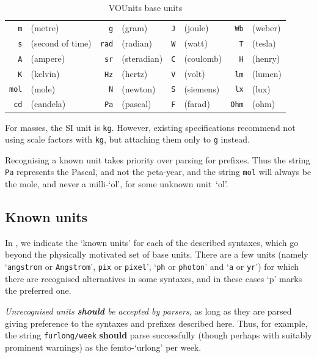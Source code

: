 \documentclass[11pt,notitlepage,onecolumn]{ivoa}
\newcommand*\norm[1]{\textbf{\color{ivoacolor}#1}}
\newcommand{\unit}[1]{\texttt{\small\color{orange}#1}}
\begin{document}
\begin{table}[ht]
\begin{center}
\def\arraystretch{1.2}
\begin{tabular}{|rl|rl|rl|rl|}\hline
\unit{m}&(metre)		&\unit{g}&(gram) 	&\unit{J}&(joule)     	&\unit{Wb}&(weber)\\
\unit{s}&(second of time)	&\unit{rad}&(radian)    &\unit{W}&(watt) 	&\unit{T}&(tesla)\\
\unit{A}&(ampere)		&\unit{sr}&(steradian)  &\unit{C}&(coulomb)	&\unit{H}&(henry)\\
\unit{K}&(kelvin)		&\unit{Hz}&(hertz)      &\unit{V}&(volt) 	&\unit{lm}&(lumen)\\
\unit{mol}&(mole)		&\unit{N}&(newton)      &\unit{S}&(siemens)	&\unit{lx}&(lux)\\
\unit{cd}&(candela)		&\unit{Pa}&(pascal)     &\unit{F}&(farad)	&\unit{Ohm}&(ohm)\\\hline
\end{tabular}
\end{center}
\caption{\label{tab:voubase}VOUnits base units}
\end{table}

For masses, the SI unit is \unit{kg}. However, existing specifications
recommend not using scale factors with \unit{kg}, but attaching them
only to \unit{g} instead.

Recognising a known unit takes priority over parsing for prefixes.
Thus the string \unit{Pa} represents the Pascal, and not the
peta-year, and the string \unit{mol} will always be the mole, and
never a milli-`ol', for some unknown unit~`ol'.

\subsection{Known units}
\label{sec:knownunits}

In , we indicate the `known units' for each of the
described syntaxes, which go beyond the physically motivated set of
base units.
There are a few units (namely `\unit{angstrom} or \unit{Angstrom}', 
\unit{pix} or \unit{pixel}', `\unit{ph} or \unit{photon}' and `\unit{a} or \unit{yr}') for
which there are recognised alternatives in some syntaxes, and in these
cases `p' marks the preferred one.

\emph{Unrecognised units \norm{should} be accepted by parsers},
as long as they are parsed giving preference to the syntaxes and
prefixes described here.  Thus, for example, the
string \unit{furlong/week} \norm{should} parse successfully (though
perhaps with suitably prominent warnings) as the femto-`urlong' per
week.
\end{document}

